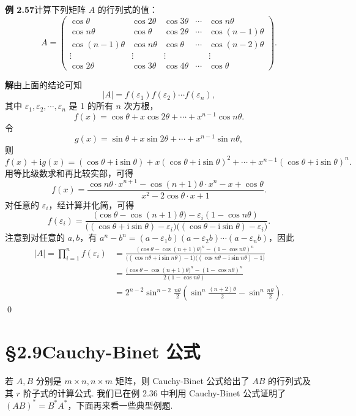 \documentclass[UTF8, 12pt, fontset=fandol, oneside]{ctexart}
\begin{document}
\noindent\textbf{例 2.57}\quad 计算下列矩阵 $A$ 的行列式的值：
\[
A=
\left(
\begin{array}{ccccc}
\cos\theta & \cos2\theta & \cos3\theta & \cdots & \cos n\theta\\
\cos n\theta & \cos\theta & \cos2\theta & \cdots & \cos(n-1)\theta\\
\cos(n-1)\theta & \cos n\theta & \cos\theta & \cdots & \cos(n-2)\theta\\
\vdots & \vdots & \vdots & & \vdots\\
\cos2\theta & \cos3\theta & \cos4\theta & \cdots & \cos\theta
\end{array}
\right).
\]

\noindent\textbf{解}\quad 由上面的结论可知
\[
|A|=f(\varepsilon_1)f(\varepsilon_2)\cdots f(\varepsilon_n),
\]
其中 $\varepsilon_1,\varepsilon_2,\cdots,\varepsilon_n$ 是 1 的所有 $n$ 次方根，
\[
f(x)=\cos\theta+x\cos2\theta+\cdots+x^{n-1}\cos n\theta.
\]
令
\[
g(x)=\sin\theta+x\sin2\theta+\cdots+x^{n-1}\sin n\theta,
\]
则
\[
f(x)+\mathrm i g(x)=(\cos\theta+\mathrm i\sin\theta)
+x(\cos\theta+\mathrm i\sin\theta)^2+\cdots
+x^{n-1}(\cos\theta+\mathrm i\sin\theta)^n.
\]
用等比级数求和再比较实部，可得
\[
f(x)=\frac{\cos n\theta\cdot x^{n+1}-\cos(n+1)\theta\cdot x^n-x+\cos\theta}
{x^2-2\cos\theta\cdot x+1}.
\]
对任意的 $\varepsilon_i$，经计算并化简，可得
\[
f(\varepsilon_i)=
\frac{\bigl(\cos\theta-\cos(n+1)\theta\bigr)-\varepsilon_i(1-\cos n\theta)}
{\bigl((\cos\theta+\mathrm i\sin\theta)-\varepsilon_i\bigr)
\bigl((\cos\theta-\mathrm i\sin\theta)-\varepsilon_i\bigr)}.
\]
注意到对任意的 $a,b$，有 $a^n-b^n=(a-\varepsilon_1b)(a-\varepsilon_2b)\cdots(a-\varepsilon_nb)$，因此
\[
\begin{aligned}
|A|=\prod_{i=1}^n f(\varepsilon_i)
&=\frac{\bigl(\cos\theta-\cos(n+1)\theta\bigr)^n-(1-\cos n\theta)^n}
{\bigl((\cos n\theta+\mathrm i\sin n\theta)-1\bigr)
\bigl((\cos n\theta-\mathrm i\sin n\theta)-1\bigr)}\\
&=\frac{\bigl(\cos\theta-\cos(n+1)\theta\bigr)^n-(1-\cos n\theta)^n}
{2(1-\cos n\theta)}\\
&=2^{n-2}\sin^{n-2}\frac{n\theta}{2}
\left(\sin^n\frac{(n+2)\theta}{2}-\sin^n\frac{n\theta}{2}\right).
\end{aligned}
\]
\qed

\section*{§2.9\quad Cauchy-Binet 公式}

若 $A,B$ 分别是 $m\times n,n\times m$ 矩阵，则 Cauchy-Binet 公式给出了 $AB$ 的行列式及其 $r$ 阶子式的计算公式. 我们已在例 2.36 中利用 Cauchy-Binet 公式证明了 $(AB)^*=B^*A^*$，下面再来看一些典型例题.
\end{document}
